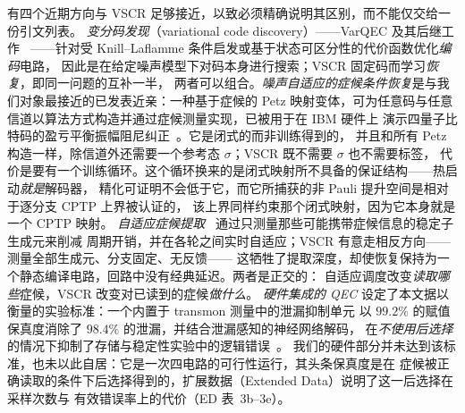 \documentclass[11pt,a4paper]{article}
\begin{document}
有四个近期方向与 VSCR 足够接近，以致必须精确说明其区别，而不能仅交给一份引文列表。
\emph{变分码发现}（variational code discovery）——VarQEC 及其后继工作~\cite{varqec_cao,varqec_meyer}
——针对受 Knill--Laflamme 条件启发或基于状态可区分性的代价函数优化\emph{编码}电路，
因此是在给定噪声模型下对码本身进行搜索；VSCR 固定码而学习\emph{恢复}，即同一问题的互补一半，
两者可以组合。\emph{噪声自适应的症候条件恢复}是与我们对象最接近的已发表近亲：一种基于症候的
Petz 映射变体，可为任意码与任意信道以算法方式构造并通过症候测量实现，已被用于在 IBM 硬件上
演示四量子比特码的盈亏平衡振幅阻尼纠正~\cite{biswas_syndrome_petz}。它是闭式的而非训练得到的，
并且和所有 Petz 构造一样，除信道外还需要一个参考态 $\sigma$；VSCR 既不需要 $\sigma$ 也不需要标签，
代价是要有一个训练循环。这个循环换来的是闭式映射所不具备的保证结构——热启动\emph{就是}解码器，
精化可证明不会低于它，而它所捕获的非 Pauli 提升空间是相对于逐分支 CPTP 上界被认证的，
该上界同样约束那个闭式映射，因为它本身就是一个 CPTP 映射。
\emph{自适应症候提取}~\cite{berthusen_ase} 通过只测量那些可能携带症候信息的稳定子生成元来削减
周期开销，并在各轮之间实时自适应；VSCR 有意走相反方向——测量全部生成元、分支固定、无反馈——
这牺牲了提取深度，却使恢复保持为一个静态编译电路，回路中没有经典延迟。两者是正交的：
自适应调度改变\emph{读取哪些}症候，VSCR 改变对已读到的症候\emph{做什么}。
\emph{硬件集成的 QEC} 设定了本文据以衡量的实验标准：一个内置于 transmon 测量中的泄漏抑制单元
以 $99.2\%$ 的赋值保真度消除了 $98.4\%$ 的泄漏，并结合泄漏感知的神经网络解码，
在\emph{不使用后选择}的情况下抑制了存储与稳定性实验中的逻辑错误~\cite{xin_lru}。
我们的硬件部分并未达到该标准，也未以此自居：它是一次四电路的可行性运行，其头条保真度是在
症候被正确读取的条件下后选择得到的，扩展数据（Extended Data）说明了这一后选择在采样次数与
有效错误率上的代价（ED 表~3b--3e）。
\end{document}
